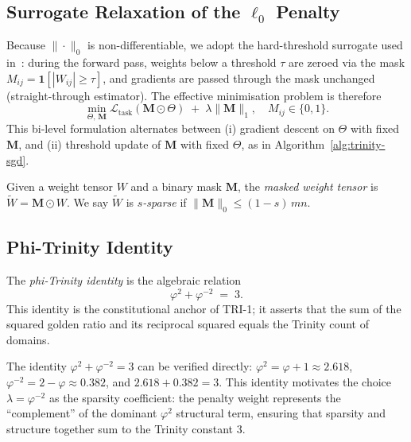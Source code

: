 \subsection{Surrogate Relaxation of the \texorpdfstring{$\ell_0$}{L0} Penalty}
\label{subsec:surrogate}

Because $\|\cdot\|_0$ is non-differentiable, we adopt the hard-threshold
surrogate used in~\cite{hanetal2015deep}: during the forward pass, weights
below a threshold $\tau$ are zeroed via the mask $M_{ij} = \mathbf{1}[|W_{ij}|
\geq \tau]$, and gradients are passed through the mask unchanged (straight-through
estimator).  The effective minimisation problem is therefore
\[
  \min_{\Theta,\,\mathbf{M}}
  \mathcal{L}_{\mathrm{task}}(\mathbf{M} \odot \Theta)
  \;+\;
  \lambda \|\mathbf{M}\|_1,
  \quad
  M_{ij} \in \{0,1\}.
\]
This bi-level formulation alternates between (i) gradient descent on $\Theta$
with fixed $\mathbf{M}$, and (ii) threshold update of $\mathbf{M}$ with fixed
$\Theta$, as in Algorithm~\ref{alg:trinity-sgd}.

\begin{definition}
\label{def:masked-weight}
Given a weight tensor $W$ and a binary mask $\mathbf{M}$, the
\emph{masked weight tensor} is $\widetilde{W} = \mathbf{M} \odot W$.  We say
$\widetilde{W}$ is \emph{$s$-sparse} if $\|\mathbf{M}\|_0 \leq (1-s)\,mn$.
\end{definition}

\subsection{Phi-Trinity Identity}
\label{subsec:phi-trinity}

\begin{definition}
\label{def:phi-trinity}
The \emph{phi-Trinity identity} is the algebraic relation
\[
  \varphi^2 + \varphi^{-2} \;=\; 3.
\]
This identity is the constitutional anchor of TRI-1; it asserts that the sum of
the squared golden ratio and its reciprocal squared equals the Trinity count of
domains.
\end{definition}

The identity $\varphi^2 + \varphi^{-2} = 3$ can be verified directly:
$\varphi^2 = \varphi + 1 \approx 2.618$, $\varphi^{-2} = 2 - \varphi \approx
0.382$, and $2.618 + 0.382 = 3$.  This identity motivates the choice
$\lambda = \varphi^{-2}$ as the sparsity coefficient: the penalty weight
represents the ``complement'' of the dominant $\varphi^2$ structural term,
ensuring that sparsity and structure together sum to the Trinity constant $3$.

